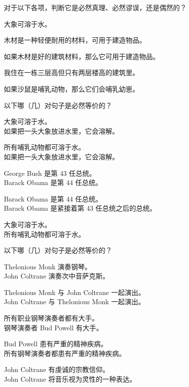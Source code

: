 \problempart
对于以下各项，判断它是必然真理、必然谬误，还是偶然的？


\begin{compactlist}
\item 大象可溶于水。
\item 木材是一种轻便耐用的材料，可用于建造物品。
\item 如果木材是好的建筑材料，那么它可用于建造物品。
\item 我住在一栋三层高但只有两层楼高的建筑里。
\item 如果沙鼠是哺乳动物，那么它们会哺乳幼崽。
\end{compactlist}

\problempart 以下哪（几）对句子是必然等价的？

\begin{compactlist}
\item 大象可溶于水。	\\
	如果把一头大象放进水里，它会溶解。
\item 所有哺乳动物都可溶于水。\\
	如果把一头大象放进水里，它会溶解。
\item George Bush 是第 43 任总统。 \\
	 Barack Obama 是第 44 任总统。
\item Barack Obama 是第 44 任总统。 \\
	  Barack Obama 是紧接着第 43 任总统之后的总统。
\item 大象可溶于水。 	\\
	所有哺乳动物都可溶于水。
\end{compactlist}


\problempart 以下哪（几）对句子是必然等价的？

\begin{compactlist}
\item  Thelonious Monk 演奏钢琴。	\\
	John Coltrane 演奏次中音萨克斯。
\item  Thelonious Monk 与 John Coltrane 一起演出。	\\
	John Coltrane 与 Thelonious Monk 一起演出。
\item  所有职业钢琴演奏者都有大手。	\\
	钢琴演奏者 Bud Powell 有大手。
\item  Bud Powell 患有严重的精神疾病。	 \\
	所有钢琴演奏者都患有严重的精神疾病。
\item John Coltrane 有虔诚的宗教信仰。	 \\
John Coltrane 将音乐视为灵性的一种表达。
\end{compactlist}

